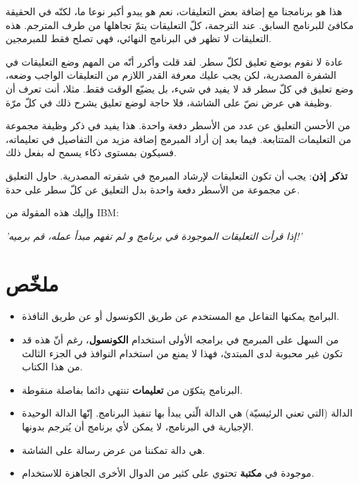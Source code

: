 هذا هو برنامجنا مع إضافة بعض التعليقات، نعم هو يبدو أكبر نوعا ما، لكنّه في الحقيقة مكافئ للبرنامج السابق. عند الترجمة، كلّ التعليقات يتمّ تجاهلها من طرف المترجم. هذه التعليقات لا تظهر في البرنامج النهائي، فهي تصلح فقط للمبرمجين.

عادة لا نقوم بوضع تعليق لكلّ سطر. لقد قلت وأكرر أنّه من المهم وضع التعليقات في الشفرة المصدرية، لكن يجب عليك معرفة القدر اللازم من التعليقات الواجب وضعه، وضع تعليق في كلّ سطر قد لا يفيد في شيء، بل يضيّع الوقت فقط. مثلا، أنت تعرف أن وظيفة
هي عرض نصّ على الشاشة، فلا حاجة لوضع تعليق يشرح ذلك في كلّ مرّة.

من الأحسن التعليق عن عدد من الأسطر دفعة واحدة. هذا يفيد في ذكر وظيفة مجموعة من التعليمات المتتابعة. فيما بعد إن أراد المبرمج إضافة مزيد من التفاصيل في تعليماته، فسيكون بمستوى ذكاء يسمح له بفعل ذلك.

\textbf{تذكر إذن}:
يجب أن تكون التعليقات لإرشاد المبرمج في شفرته المصدرية. حاول التعليق عن مجموعة من الأسطر دفعة واحدة بدل التعليق عن كلّ سطر على حدة.

وإليك هذه المقولة من
\textenglish{IBM}:

\begin{center}
  \itshape\Large
  'إذا قرأت التعليقات الموجودة في برنامج و لم تفهم مبدأ عمله، قم برميه!'
\end{center}

\section*{ملخّص}

\begin{itemize}
  \item البرامج يمكنها التفاعل مع المستخدم عن طريق الكونسول أو عن طريق النافذة.
  \item من السهل على المبرمج في برامجه الأولى استخدام
\textbf{الكونسول}،
رغم أنّ هذه قد تكون غير محبوبة لدى المبتدئ، فهذا لا يمنع من استخدام النوافذ في الجزء الثالث من هذا الكتاب.
  \item البرنامج يتكوّن من
\textbf{تعليمات}
 تنتهي دائما بفاصلة منقوطة.
  \item الدالة
 (التي تعني الرئيسيّة) هي الدالة الّتي يبدأ بها تنفيذ البرنامج. إنّها الدالة الوحيدة الإجبارية في البرنامج، لا يمكن لأي برنامج أن يُترجم بدونها.
 \item {}
 هي دالة تمكننا من عرض رسالة على الشاشة.
 \item {}
موجودة في
\textbf{مكتبة}
 تحتوي على كثير من الدوال الأخرى الجاهزة للاستخدام.
\end{itemize}
